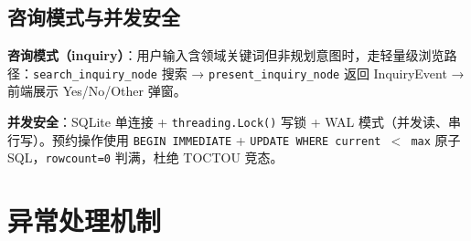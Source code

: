 \documentclass[10pt,a4paper]{ctexart}
\begin{document}
\subsection{咨询模式与并发安全}

\textbf{咨询模式（inquiry）}：用户输入含领域关键词但非规划意图时，走轻量级浏览路径：\texttt{search\_inquiry\_node} 搜索 → \texttt{present\_inquiry\_node} 返回 InquiryEvent → 前端展示 Yes/No/Other 弹窗。

\textbf{并发安全}：SQLite 单连接 + \texttt{threading.Lock()} 写锁 + WAL 模式（并发读、串行写）。预约操作使用 \texttt{BEGIN IMMEDIATE} + \texttt{UPDATE WHERE current $<$ max} 原子 SQL，\texttt{rowcount=0} 判满，杜绝 TOCTOU 竞态。

\section{异常处理机制}
\end{document}
